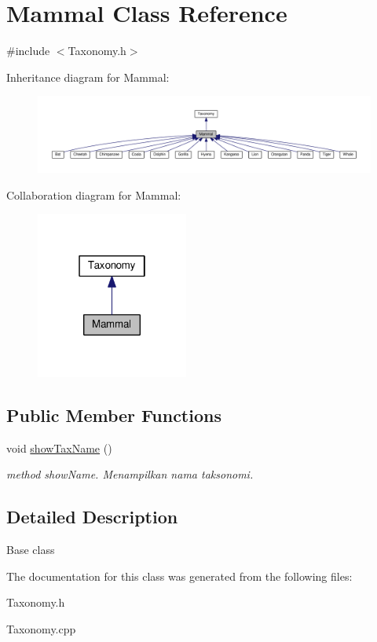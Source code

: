 \hypertarget{classMammal}{}\section{Mammal Class Reference}
\label{classMammal}


{\ttfamily \#include $<$Taxonomy.\+h$>$}



Inheritance diagram for Mammal\+:
\nopagebreak
\begin{figure}[H]
\begin{center}
\leavevmode
\includegraphics[width=350pt]{classMammal__inherit__graph}
\end{center}
\end{figure}


Collaboration diagram for Mammal\+:
\nopagebreak
\begin{figure}[H]
\begin{center}
\leavevmode
\includegraphics[width=142pt]{classMammal__coll__graph}
\end{center}
\end{figure}
\subsection*{Public Member Functions}
\begin{DoxyCompactItemize}
\item 
void \hyperlink{classMammal_a339b8cfa7a68fd1df89bce06c24e62ff}{show\+Tax\+Name} ()\hypertarget{classMammal_a339b8cfa7a68fd1df89bce06c24e62ff}{}\label{classMammal_a339b8cfa7a68fd1df89bce06c24e62ff}

\begin{DoxyCompactList}\small\item\em method show\+Name. Menampilkan nama taksonomi. \end{DoxyCompactList}\end{DoxyCompactItemize}


\subsection{Detailed Description}
Base class 

The documentation for this class was generated from the following files\+:\begin{DoxyCompactItemize}
\item 
Taxonomy.\+h\item 
Taxonomy.\+cpp\end{DoxyCompactItemize}
